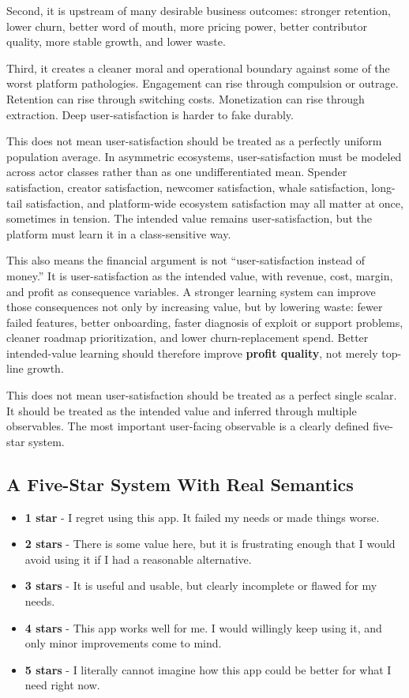 \documentclass[11pt]{article}
\begin{document}
Second, it is upstream of many desirable business outcomes: stronger retention, lower churn, better word of mouth, more pricing power, better contributor quality, more stable growth, and lower waste.

Third, it creates a cleaner moral and operational boundary against some of the worst platform pathologies. Engagement can rise through compulsion or outrage. Retention can rise through switching costs. Monetization can rise through extraction. Deep user-satisfaction is harder to fake durably.

This does not mean user-satisfaction should be treated as a perfectly uniform population average. In asymmetric ecosystems, user-satisfaction must be modeled across actor classes rather than as one undifferentiated mean. Spender satisfaction, creator satisfaction, newcomer satisfaction, whale satisfaction, long-tail satisfaction, and platform-wide ecosystem satisfaction may all matter at once, sometimes in tension. The intended value remains user-satisfaction, but the platform must learn it in a class-sensitive way.

This also means the financial argument is not ``user-satisfaction instead of money.'' It is user-satisfaction as the intended value, with revenue, cost, margin, and profit as consequence variables. A stronger learning system can improve those consequences not only by increasing value, but by lowering waste: fewer failed features, better onboarding, faster diagnosis of exploit or support problems, cleaner roadmap prioritization, and lower churn-replacement spend. Better intended-value learning should therefore improve \textbf{profit quality}, not merely top-line growth.

This does not mean user-satisfaction should be treated as a perfect single scalar. It should be treated as the intended value and inferred through multiple observables. The most important user-facing observable is a clearly defined five-star system.

\subsection{A Five-Star System With Real Semantics}

\begin{itemize}
  \item \textbf{1 star} - I regret using this app. It failed my needs or made things worse.
  \item \textbf{2 stars} - There is some value here, but it is frustrating enough that I would avoid using it if I had a reasonable alternative.
  \item \textbf{3 stars} - It is useful and usable, but clearly incomplete or flawed for my needs.
  \item \textbf{4 stars} - This app works well for me. I would willingly keep using it, and only minor improvements come to mind.
  \item \textbf{5 stars} - I literally cannot imagine how this app could be better for what I need right now.
\end{itemize}
\end{document}
